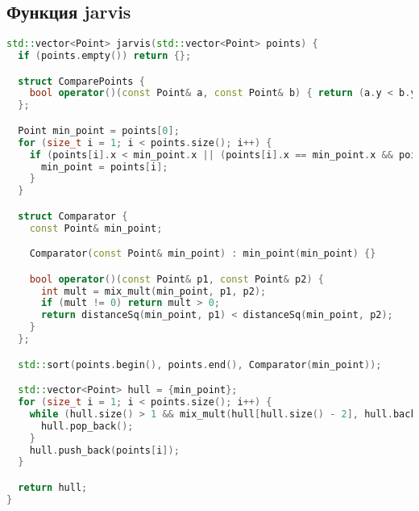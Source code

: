 \documentclass[12pt]{article}
\begin{document}
\subsection*{Функция  jarvis}

\begin{lstlisting}[language=C++]
std::vector<Point> jarvis(std::vector<Point> points) {
  if (points.empty()) return {};

  struct ComparePoints {
    bool operator()(const Point& a, const Point& b) { return (a.y < b.y) || (a.y == b.y && a.x < b.x); }
  };

  Point min_point = points[0];
  for (size_t i = 1; i < points.size(); i++) {
    if (points[i].x < min_point.x || (points[i].x == min_point.x && points[i].y < min_point.y)) {
      min_point = points[i];
    }
  }

  struct Comparator {
    const Point& min_point;

    Comparator(const Point& min_point) : min_point(min_point) {}

    bool operator()(const Point& p1, const Point& p2) {
      int mult = mix_mult(min_point, p1, p2);
      if (mult != 0) return mult > 0;
      return distanceSq(min_point, p1) < distanceSq(min_point, p2);
    }
  };

  std::sort(points.begin(), points.end(), Comparator(min_point));

  std::vector<Point> hull = {min_point};
  for (size_t i = 1; i < points.size(); i++) {
    while (hull.size() > 1 && mix_mult(hull[hull.size() - 2], hull.back(), points[i]) <= 0) {
      hull.pop_back();
    }
    hull.push_back(points[i]);
  }

  return hull;
}
\end{lstlisting}
\end{document}
